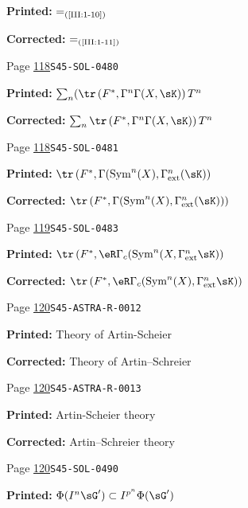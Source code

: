 \begin{description}
\par\noindent\textbf{Printed:} \(=_{\text{(\ref{III:1-10})}}\)
\par\noindent\textbf{Corrected:} \(=_{\text{(\ref{III:1-11})}}\)
\smallskip
\item[\hypertarget{apparatus:EN-0051}{51}] Page \hyperlink{printpage:en:118}{118}\quad\texttt{S45-SOL-0480}
\par\noindent\textbf{Printed:} \(\sum_n (\tr\left(F^*,\Gamma^n \Gamma(X,\sK)\right) T^n\)
\par\noindent\textbf{Corrected:} \(\sum_n \tr\left(F^*,\Gamma^n \Gamma(X,\sK)\right) T^n\)
\smallskip
\item[\hypertarget{apparatus:EN-0052}{52}] Page \hyperlink{printpage:en:118}{118}\quad\texttt{S45-SOL-0481}
\par\noindent\textbf{Printed:} \(\tr\left(F^*,\Gamma(\operatorname{Sym}^n(X),\Gamma_\text{ext}^n(\sK)\right)\)
\par\noindent\textbf{Corrected:} \(\tr\left(F^*,\Gamma(\operatorname{Sym}^n(X),\Gamma_\text{ext}^n(\sK))\right)\)
\smallskip
\item[\hypertarget{apparatus:EN-0053}{53}] Page \hyperlink{printpage:en:119}{119}\quad\texttt{S45-SOL-0483}
\par\noindent\textbf{Printed:} \(\tr\left(F^*,\eR\Gamma_c(\operatorname{Sym}^n(X,\Gamma_\text{ext}^n \sK)\right)\)
\par\noindent\textbf{Corrected:} \(\tr\left(F^*,\eR\Gamma_c(\operatorname{Sym}^n(X),\Gamma_\text{ext}^n \sK)\right)\)
\smallskip
\item[\hypertarget{apparatus:EN-0054}{54}] Page \hyperlink{printpage:en:120}{120}\quad\texttt{S45-ASTRA-R-0012}
\par\noindent\textbf{Printed:} Theory of Artin-Scheier
\par\noindent\textbf{Corrected:} Theory of Artin--Schreier
\smallskip
\item[\hypertarget{apparatus:EN-0055}{55}] Page \hyperlink{printpage:en:120}{120}\quad\texttt{S45-ASTRA-R-0013}
\par\noindent\textbf{Printed:} Artin-Scheier theory 
\par\noindent\textbf{Corrected:} Artin--Schreier theory 
\smallskip
\item[\hypertarget{apparatus:EN-0056}{56}] Page \hyperlink{printpage:en:120}{120}\quad\texttt{S45-SOL-0490}
\par\noindent\textbf{Printed:} \(\Phi(I^n \sG')\subset I^{p^n}\Phi(\sG')\)

\end{description}
